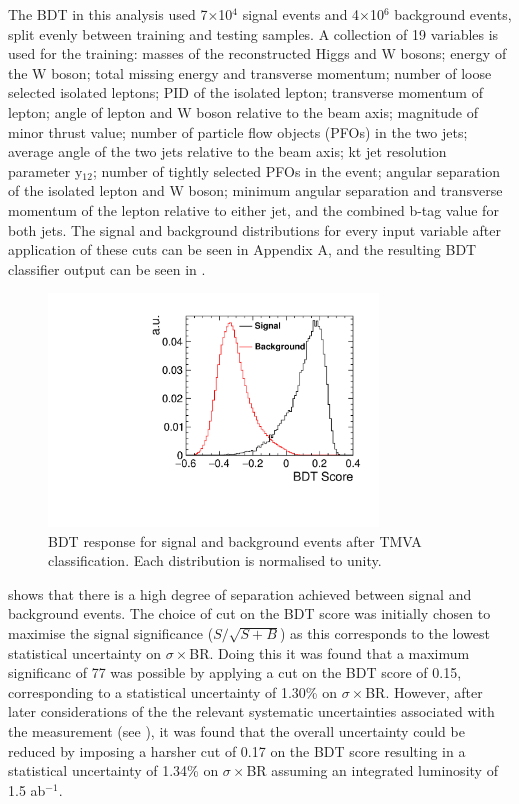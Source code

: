 The \ac{BDT} in this analysis used 7$\times$10$^4$ signal events and 4$\times$10$^6$ background events, split evenly between training and testing samples. A collection of 19 variables is used for the training: masses of the reconstructed Higgs and W bosons; energy of the W boson; total missing energy and transverse momentum; number of loose selected isolated leptons; PID of the isolated lepton; transverse momentum of lepton; angle of lepton and W boson relative to the beam axis; magnitude of minor thrust value; number of particle flow objects (PFOs) in the two jets; average angle of the two jets relative to the beam axis; kt jet resolution parameter y$_{12}$; number of tightly selected PFOs in the event; angular separation of the isolated lepton and W boson;  minimum angular separation and transverse momentum of the lepton relative to either jet, and the combined b-tag value for both jets. The signal and background distributions for every input variable after application of these cuts can be seen in Appendix A, and the resulting BDT classifier output can be seen in .  

\begin{figure}
  \centering
  \includegraphics[width=0.78\textwidth,keepaspectratio]{HiggsAnalysis/figures/bdtscore}
  \caption[Classifier BDT response]{BDT response for signal and background events after TMVA classification. Each distribution is normalised to unity.}
  \label{bdt}
\end{figure}

 shows that there is a high degree of separation achieved between signal and background events.
The choice of cut on the BDT score was initially chosen to maximise the signal significance ($S/\sqrt{S+B}$) as this corresponds to the lowest statistical uncertainty on $\sigma\times$BR. Doing this it was found that a maximum significanc of 77 was possible by applying a cut on the BDT score of 0.15, corresponding to a statistical uncertainty of 1.30\% on $\sigma\times$BR. However, after later considerations of the the relevant systematic uncertainties associated with the measurement (see ), it was found that the overall uncertainty could be reduced by imposing a harsher cut of 0.17 on the BDT score resulting in a statistical uncertainty of 1.34\% on $\sigma\times$BR assuming an integrated luminosity of 1.5 ab$^{-1}$.

